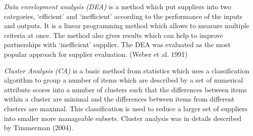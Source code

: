 \documentclass[oneside,12pt]{article}%
\begin{document}
\emph{Data envelopment analysis (DEA)} is a method which put suppliers into two categories, ‘efficient’ and ‘inefficient’ according to the performance of the inputs and outputs. It is a linear programming method which allows to measure multiple criteria at once. The method also gives results which can help to improve partnerships with ‘inefficient’ supplier. The DEA was evaluated as the most popular approach for supplier evaluation. (Weber et al. 1991) \par

\emph{Cluster Analysis (CA)} is a basic method from statistics which uses a classification algorithm to group a number of items which are described by a set of numerical attribute scores into a number of clusters such that the differences between items within a cluster are minimal and the differences between items from different clusters are maximal. This classification is used to reduce a larger set of suppliers into smaller more manageable subsets. Cluster analysis was in details described by Timmerman (2004).
\end{document}
